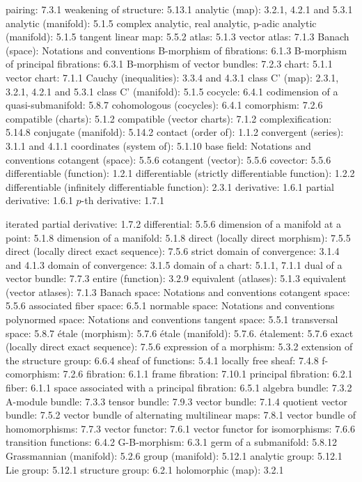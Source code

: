 
pairing: 7.3.1 weakening of structure: 5.13.1 analytic (map): 3.2.1, 4.2.1 and 5.3.1 analytic (manifold): 5.1.5 complex analytic, real analytic, p-adic analytic (manifold): 5.1.5 tangent linear map: 5.5.2 atlas: 5.1.3 vector atlas: 7.1.3 Banach (space): Notations and conventions B-morphism of fibrations: 6.1.3 B-morphism of principal fibrations: 6.3.1 B-morphism of vector bundles: 7.2.3 chart: 5.1.1 vector chart: 7.1.1 Cauchy (inequalities): 3.3.4 and 4.3.1 class C' (map): 2.3.1, 3.2.1, 4.2.1 and 5.3.1 class C' (manifold): 5.1.5 cocycle: 6.4.1 codimension of a quasi-submanifold: 5.8.7 cohomologous (cocycles): 6.4.1 comorphism: 7.2.6 compatible (charts): 5.1.2 compatible (vector charts): 7.1.2 complexification: 5.14.8 conjugate (manifold): 5.14.2 contact (order of): 1.1.2 convergent (series): 3.1.1 and 4.1.1 coordinates (system of): 5.1.10 base field: Notations and conventions cotangent (space): 5.5.6 cotangent (vector): 5.5.6 covector: 5.5.6 differentiable (function): 1.2.1 differentiable (strictly differentiable function): 1.2.2 differentiable (infinitely differentiable function): 2.3.1 derivative: 1.6.1 partial derivative: 1.6.1 \(p\)-th derivative: 1.7.1

iterated partial derivative: 1.7.2 differential: 5.5.6 dimension of a manifold at a point: 5.1.8 dimension of a manifold: 5.1.8 direct (locally direct morphism): 7.5.5 direct (locally direct exact sequence): 7.5.6 strict domain of convergence: 3.1.4 and 4.1.3 domain of convergence: 3.1.5 domain of a chart: 5.1.1, 7.1.1 dual of a vector bundle: 7.7.3 entire (function): 3.2.9 equivalent (atlases): 5.1.3 equivalent (vector atlases): 7.1.3 Banach space: Notations and conventions cotangent space: 5.5.6 associated fiber space: 6.5.1 normable space: Notations and conventions polynormed space: Notations and conventions tangent space: 5.5.1 transversal space: 5.8.7 étale (morphism): 5.7.6 étale (manifold): 5.7.6. étalement: 5.7.6 exact (locally direct exact sequence): 7.5.6 expression of a morphism: 5.3.2 extension of the structure group: 6.6.4 sheaf of functions: 5.4.1 locally free sheaf: 7.4.8 f-comorphism: 7.2.6 fibration: 6.1.1 frame fibration: 7.10.1 principal fibration: 6.2.1 fiber: 6.1.1 space associated with a principal fibration: 6.5.1 algebra bundle: 7.3.2 A-module bundle: 7.3.3 tensor bundle: 7.9.3 vector bundle: 7.1.4 quotient vector bundle: 7.5.2 vector bundle of alternating multilinear maps: 7.8.1 vector bundle of homomorphisms: 7.7.3 vector functor: 7.6.1 vector functor for isomorphisms: 7.6.6 transition functions: 6.4.2 G-B-morphism: 6.3.1 germ of a submanifold: 5.8.12 Grassmannian (manifold): 5.2.6 group (manifold): 5.12.1 analytic group: 5.12.1 Lie group: 5.12.1 structure group: 6.2.1 holomorphic (map): 3.2.1

